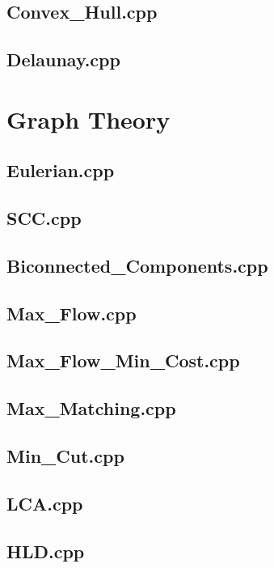 \subsection{Convex\_Hull.cpp}

\subsection{Delaunay.cpp}

\section{Graph Theory}
\subsection{Eulerian.cpp}

\subsection{SCC.cpp}

\subsection{Biconnected\_Components.cpp}

\subsection{Max\_Flow.cpp}

\subsection{Max\_Flow\_Min\_Cost.cpp}

\subsection{Max\_Matching.cpp}

\subsection{Min\_Cut.cpp}

\subsection{LCA.cpp}

\subsection{HLD.cpp}

